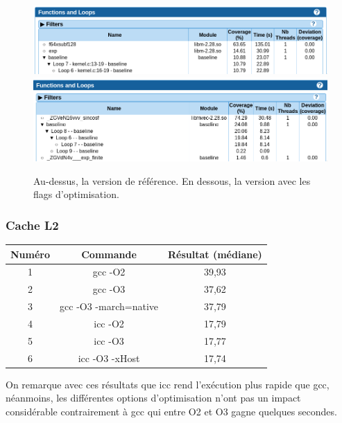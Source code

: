 \documentclass[12pt,a4paper]{article}
\begin{document}
\begin{figure}[h]
    \centering
    \includegraphics[scale=0.5]{./figures/L1/maqao_noopt_ref_func.png}
    \includegraphics[scale=0.5]{./figures/L1/maqao_noopt_opt_func.png}
    \caption{Au-dessus, la version de référence. En dessous, la version avec les
    flags d'optimisation.}
    \label{fig.maqao_noopt_func}
\end{figure}

\subsubsection{Cache L2}

\begin{table}[h]
    \centering
    \begin{tabular}{|c|c|c|}
        \hline
        Numéro & Commande & Résultat (médiane)\\
        \hline
        1 & gcc -O2 & 39,93 \\
        \hline
        2 & gcc -O3 & 37,62 \\
        \hline
        3 & gcc -O3 -march=native & 37,79 \\
        \hline
        4 & icc -O2 & 17,79 \\
        \hline
        5 & icc -O3 & 17,77 \\
        \hline
        6 & icc -O3 -xHost & 17,74 \\
        \hline
    \end{tabular}
\end{table}

On remarque avec ces résultats que icc rend l'exécution plus rapide que 
gcc, néanmoins, les différentes options d'optimisation n’ont pas un impact
considérable contrairement à gcc qui entre O2 et O3 gagne quelques secondes.
\end{document}
